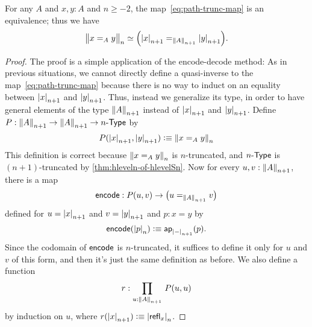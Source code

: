 \begin{thm} \label{thm:path-truncation}
  For any $A$ and $x,y:A$ and $n\ge -2$, the map~\eqref{eq:path-trunc-map} is an equivalence; thus we have
  \[ \eqv{\ttrunc n{x=_Ay}}{\Big(\tproj {n+1}x=_{\trunc{n+1}A}\tproj {n+1}y\Big)}. \]
\end{thm}

\begin{proof}
  The proof is a simple application of the encode-decode method: 
  As in previous situations, we cannot directly define a quasi-inverse to the map~\eqref{eq:path-trunc-map} because there is no way to induct on an
equality between $\tproj {n+1}x$ and $\tproj {n+1}y$.
  Thus, instead we generalize its type, in order to have general elements of the type $\trunc{n+1}A$ instead of $\tproj {n+1}x$ and $\tproj
{n+1}y$.
  Define $P:\trunc {n+1}A\to\trunc {n+1}A\to\typele{n}$ by
  \[P(\tproj {n+1}x,\tproj {n+1}y)\defeq \trunc n{x=_Ay}\]
  This definition is correct because $\trunc n{x=_Ay}$ is $n$-truncated, and $\typele{n}$ is $(n+1)$-truncated by
\autoref{thm:hleveln-of-hlevelSn}.
  Now for every $u,v:\trunc{n+1}A$, there is a map
  \[\encode:P(u,v) \to \big(u=_{\trunc{n+1}A}v\big)\]
  defined for $u=\tproj {n+1}x$ and $v=\tproj {n+1}y$ and $p:x=y$ by
  \[\encode(\tproj n{p})\defeq \apfunc{\tproj{n+1}-} (p).\]
  Since the codomain of $\encode$ is $n$-truncated, it suffices to define it only for $u$ and $v$ of this form, and then it's just the same
definition as before.
  We also define a function
  \[ r : \prd{u:\trunc{n+1} A} P(u,u) \]
  by induction on $u$, where $r(\tproj{n+1} x) \defeq \tproj n {\refl x}$.


\end{proof}
